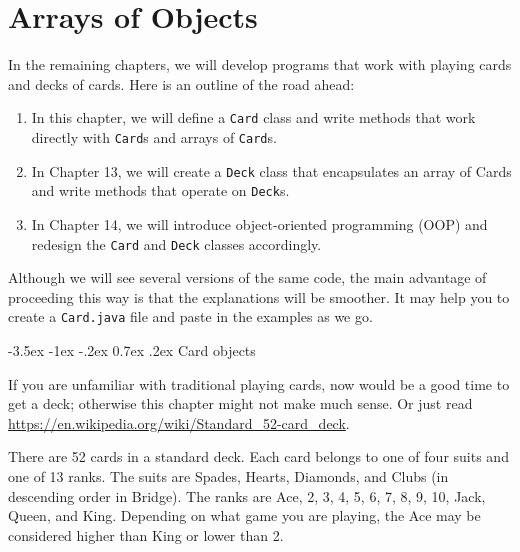 \documentclass[12pt]{book}
\title{\thetitle}
\author{\theauthors}
\date{\theversion}
\makeatletter
\renewcommand{\section}{\@startsection {section}{1}{\z@}%
    {-3.5ex \@plus -1ex \@minus -.2ex}%
    {0.7ex \@plus.2ex}%
    {\normalfont\Large\bfseries}}
\theoremstyle{exercise}
\newcommand{\java}[1]{\lstinline{#1}} %
\makeatother
\begin{document}
\setcounter{chapter}{11}


\chapter{Arrays of Objects}

In the remaining chapters, we will develop programs that work with playing cards and decks of cards.
Here is an outline of the road ahead:

\begin{enumerate}

\item In this chapter, we will define a \java{Card} class and write methods that work directly with \java{Card}s and arrays of \java{Card}s.


\item In Chapter 13, we will create a \java{Deck} class that encapsulates an array of Cards and write methods that operate on \java{Deck}s.

\item In Chapter 14, we will introduce object-oriented programming (OOP) and redesign the \java{Card} and \java{Deck} classes accordingly.

\end{enumerate}

Although we will see several versions of the same code, the main advantage of proceeding this way is that the explanations will be smoother.
It may help you to create a {\tt Card.java} file and paste in the examples as we go.



\section{Card objects}
\label{card}


If you are unfamiliar with traditional playing cards, now would be a good time to get a deck; otherwise this chapter might not make much sense.
Or just read \url{https://en.wikipedia.org/wiki/Standard_52-card_deck}.


There are 52 cards in a standard deck.
Each card belongs to one of four suits and one of 13 ranks.
The suits are Spades, Hearts, Diamonds, and Clubs (in descending order in Bridge).
The ranks are Ace, 2, 3, 4, 5, 6, 7, 8, 9, 10, Jack, Queen, and King.
Depending on what game you are playing, the Ace may be considered higher than King or lower than 2.
\end{document}
